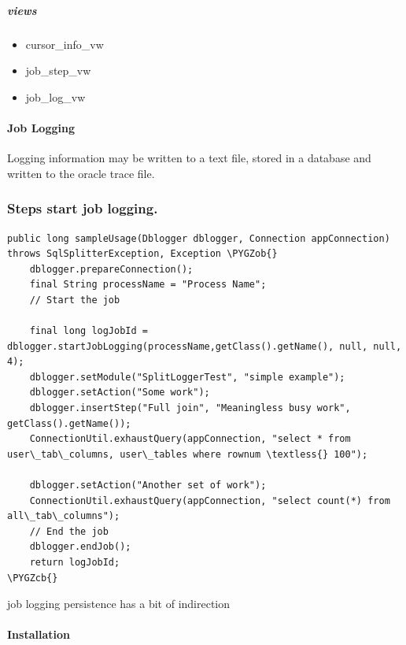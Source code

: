 \documentclass[letterpaper,10pt,english]{sphinxmanual}
\def\PYGZob{\char`\{}
\def\PYGZcb{\char`\}}
\begin{document}
\subparagraph{views}
\label{databaseLogging:views}\begin{itemize}
\item {} 
cursor\_info\_vw

\item {} 
job\_step\_vw

\item {} 
job\_log\_vw

\end{itemize}


\paragraph{Job Logging}
\label{databaseLogging:job-logging}
Logging information may be written to a text file, stored in a database
and written to the oracle trace file.


\subsubsection{Steps start job logging.}
\label{databaseLogging:steps-start-job-logging}
\begin{Verbatim}[commandchars=\\\{\}]
public long sampleUsage(Dblogger dblogger, Connection appConnection) throws SqlSplitterException, Exception \PYGZob{}
    dblogger.prepareConnection();
    final String processName = "Process Name";
    // Start the job

    final long logJobId = dblogger.startJobLogging(processName,getClass().getName(), null, null,  4);
    dblogger.setModule("SplitLoggerTest", "simple example");
    dblogger.setAction("Some work");
    dblogger.insertStep("Full join", "Meaningless busy work", getClass().getName());
    ConnectionUtil.exhaustQuery(appConnection, "select * from user\_tab\_columns, user\_tables where rownum \textless{} 100");

    dblogger.setAction("Another set of work");
    ConnectionUtil.exhaustQuery(appConnection, "select count(*) from all\_tab\_columns");
    // End the job
    dblogger.endJob();
    return logJobId;
\PYGZcb{}
\end{Verbatim}

job logging persistence has a bit of indirection


\paragraph{Installation}
\label{databaseLogging:installation}
\end{document}
